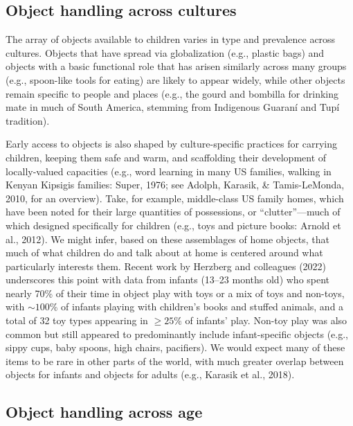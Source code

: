 \documentclass[10pt, letterpaper]{article}
\begin{document}
\hypertarget{object-handling-across-cultures}{%
\subsection{Object handling across
cultures}\label{object-handling-across-cultures}}

The array of objects available to children varies in type and prevalence
across cultures. Objects that have spread via globalization (e.g.,
plastic bags) and objects with a basic functional role that has arisen
similarly across many groups (e.g., spoon-like tools for eating) are
likely to appear widely, while other objects remain specific to people
and places (e.g., the gourd and bombilla for drinking mate in much of
South America, stemming from Indigenous Guaraní and Tupí tradition).

Early access to objects is also shaped by culture-specific practices for
carrying children, keeping them safe and warm, and scaffolding their
development of locally-valued capacities (e.g., word learning in many US
families, walking in Kenyan Kipsigis families: Super, 1976; see Adolph,
Karasik, \& Tamis-LeMonda, 2010, for an overview). Take, for example,
middle-class US family homes, which have been noted for their large
quantities of possessions, or ``clutter''---much of which designed
specifically for children (e.g., toys and picture books: Arnold et al.,
2012). We might infer, based on these assemblages of home objects, that
much of what children do and talk about at home is centered around what
particularly interests them. Recent work by Herzberg and colleagues
(2022) underscores this point with data from infants (13--23 months old)
who spent nearly 70\% of their time in object play with toys or a mix of
toys and non-toys, with \({\sim}100\%\) of infants playing with
children's books and stuffed animals, and a total of 32 toy types
appearing in \({\ge}25\%\) of infants' play. Non-toy play was also
common but still appeared to predominantly include infant-specific
objects (e.g., sippy cups, baby spoons, high chairs, pacifiers). We
would expect many of these items to be rare in other parts of the world,
with much greater overlap between objects for infants and objects for
adults (e.g., Karasik et al., 2018).

\hypertarget{object-handling-across-age}{%
\subsection{Object handling across
age}\label{object-handling-across-age}}
\end{document}
